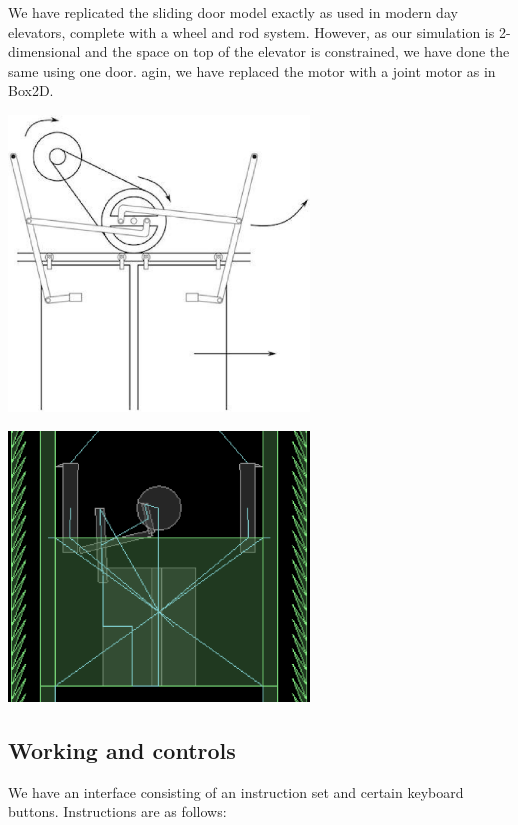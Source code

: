 \documentclass[a4paper,11pt]{article}
\begin{document}
We have replicated the sliding door model exactly as used in modern day elevators, complete with a wheel and rod system. However, as our simulation is 2-dimensional and the space on top of the elevator is constrained, we have done the same using one door. agin, we have replaced the motor with a joint motor as in Box2D.

\begin{center}
\includegraphics[width=0.6\textwidth]{images/doorOrig.eps} 
\end{center}


\begin{center}
\includegraphics[width=0.6\textwidth]{images/door.eps} 
\end{center}

\subsection{Working and controls}

We have an interface consisting of an instruction set and certain keyboard buttons.
Instructions are as follows:
\end{document}
